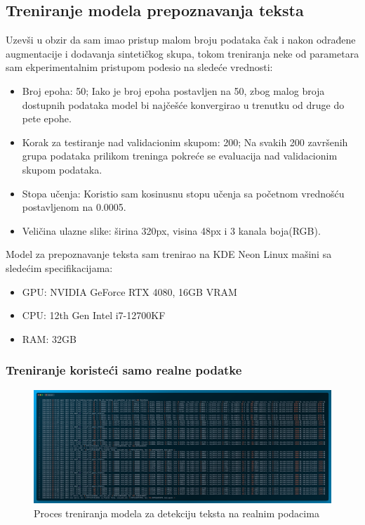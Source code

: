 \documentclass[a4paper,12pt]{article}
\begin{document}
	\subsection{Treniranje modela prepoznavanja teksta}
	Uzevši u obzir da sam imao pristup malom broju podataka čak i nakon odrađene augmentacije i dodavanja sintetičkog skupa, tokom treniranja neke od parametara sam ekperimentalnim pristupom podesio na sledeće vrednosti:
	\begin{itemize}
		\item Broj epoha: 50; Iako je broj epoha postavljen na 50, zbog malog broja dostupnih podataka model bi najčešće konvergirao u trenutku od druge do pete epohe.
		\item Korak za testiranje nad validacionim skupom: 200; Na svakih 200 završenih grupa podataka prilikom treninga pokreće se evaluacija nad validacionim skupom podataka.
		\item {}Stopa učenja: Koristio sam kosinusnu stopu učenja sa početnom vrednošću postavljenom na 0.0005.
		\item Veličina ulazne slike: širina 320px, visina 48px i 3 kanala boja(RGB).
	\end{itemize}
	
	Model za prepoznavanje teksta sam trenirao na KDE Neon Linux mašini sa sledećim specifikacijama:
	\begin{itemize}
		\item GPU: NVIDIA GeForce RTX 4080, 16GB VRAM
		\item CPU: 12th Gen Intel i7-12700KF
		\item RAM: 32GB
	\end{itemize}
	
	\subsubsection{Treniranje koristeći samo realne podatke}
	\begin{figure}[H]
		\centering
		\includegraphics[width=\textwidth]{assets/train-code-real-data.png}
		\caption{Proces treniranja modela za detekciju teksta na realnim podacima}
		\label{fig:train-code-real-data}
	\end{figure}
	
\end{document}
